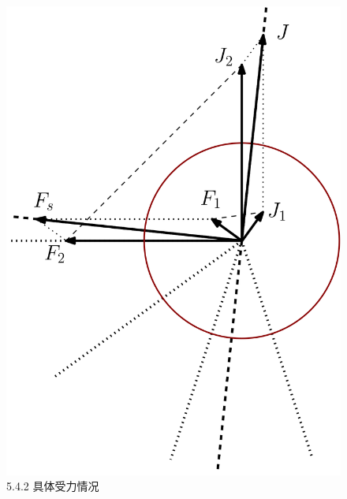 \documentclass[nocover]{cumcmart}%
\begin{document}
\begin{figure}[h!]
    \centering
    \includegraphics[width=0.4\linewidth]{figures/5.png}
    \caption{5.4.2 具体受力情况}
    \label{5.4.2 具体受力情况}
\end{figure}
\end{document}
